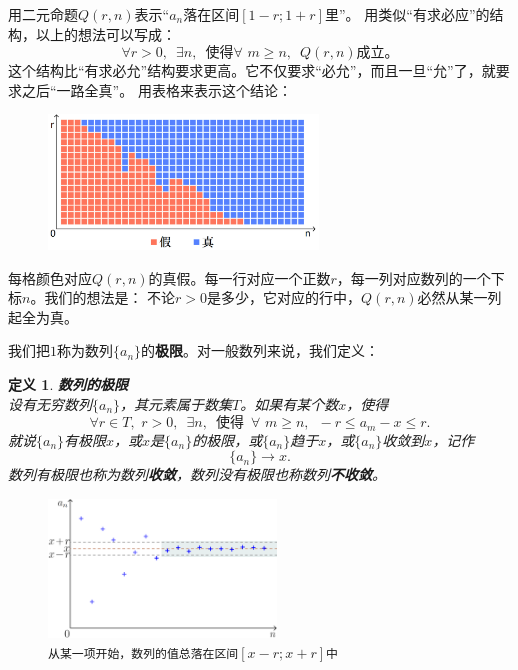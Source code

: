 \documentclass[12pt,UTF8]{ctexbook}
\newtheorem{df}{定义}[section]
\begin{document}
用二元命题$Q(r, n)$表示“$a_n$落在区间$[1-r;1+r]$里”。
用类似“有求必应”的结构，以上的想法可以写成：
$$\forall r > 0, \,\,\, \exists n,  \,\,\, \mbox{使得} \forall \,\, m \geqslant n, \,\,\, Q(r, n)\mbox{成立。}$$
这个结构比“有求必允”结构要求更高。它不仅要求“必允”，而且一旦“允”了，就要求之后“一路全真”。
用表格来表示这个结论：

\begin{figure}[h] %
    \centering
    \includegraphics[width=0.64\textwidth]{tu/数列极限2.png}
\end{figure}

每格颜色对应$Q(r, n)$的真假。每一行对应一个正数$r$，每一列对应数列的一个下标$n$。我们的想法是：
不论$r>0$是多少，它对应的行中，$Q(r, n)$必然从某一列起全为真。

我们把$1$称为数列$\{a_n\}$的\textbf{极限}。对一般数列来说，我们定义：
\begin{df}\textbf{数列的极限} \\
设有无穷数列$\{a_n\}$，其元素属于数集$T$。如果有某个数$x$，使得
$$ \forall r\in T, \,\, r > 0, \,\,\, \exists n,  \,\,\, \mbox{使得} \,\,\, \forall \,\, m \geqslant n, \,\,\, - r \leqslant a_m - x \leqslant r. $$
就说$\{a_n\}$有极限$x$，或$x$是$\{a_n\}$的极限，或$\{a_n\}$趋于$x$，或$\{a_n\}$收敛到$x$，记作
$$\{a_n\} \to x.$$
数列有极限也称为数列\textbf{收敛}，数列没有极限也称数列\textbf{不收敛}。
\end{df}

\begin{figure}[h] %
    \vspace{-14pt}
    \centering
    \includegraphics[width=0.54\textwidth]{tu/数列极限1.png}
    \caption*{\texttt{从某一项开始，数列的值总落在区间}$[x-r;x+r]$\texttt{中}}
\end{figure}
\end{document}
